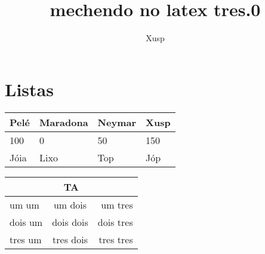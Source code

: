 \documentclass[a4paper,11pt]{report}
\title{mechendo no latex tres.0}
\author{Xusp}
\begin{document}
\maketitle
\tableofcontents
\chapter{Listas}
\begin{tabular}{||p{5cm}||*{3}{l||}} %
\hline
\textbf{Pelé} & \textbf{Maradona} & \textbf{Neymar} & \textbf{Xusp}\\
\hline
100 & 0 & 50 & 150\\
\hline
Jóia & Lixo & Top & Jóp\\
\hline
\end{tabular}

\begin{table}[htpb] %
\begin{center}
\begin{tabular}{|lcr|}

\cline{2-2}
\multicolumn{3}{c}{TA}\\
\hline
um um & um dois & um tres\\
\hline
dois um & dois dois & dois tres\\
\hline
tres um & tres dois & tres tres\\
\hline
\end{tabular}
\end{center}
\end{table}

\end{document}
